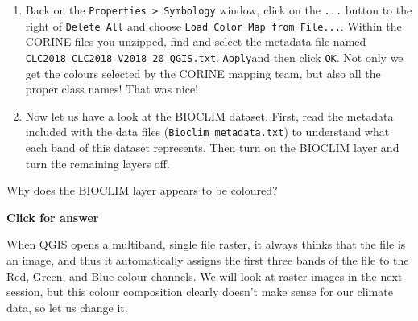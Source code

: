\documentclass[
  letterpaper,
  DIV=11,
  numbers=noendperiod]{scrreprt}
\begin{document}
\begin{enumerate}
\def\labelenumi{(\arabic{enumi})}
\setcounter{enumi}{141}
\item
  Back on the \texttt{Properties\ \textgreater{}\ Symbology} window,
  click on the \texttt{...} button to the right of \texttt{Delete\ All}
  and choose \texttt{Load\ Color\ Map\ from\ File...}. Within the CORINE
  files you unzipped, find and select the metadata file named
  \texttt{CLC2018\_CLC2018\_V2018\_20\_QGIS.txt}. \texttt{Apply}and then
  click \texttt{OK}. Not only we get the colours selected by the CORINE
  mapping team, but also all the proper class names! That was nice!
\item
  Now let us have a look at the BIOCLIM dataset. First, read the
  metadata included with the data files (\texttt{Bioclim\_metadata.txt})
  to understand what each band of this dataset represents. Then turn on
  the BIOCLIM layer and turn the remaining layers off.
\end{enumerate}

\begin{tcolorbox}[enhanced jigsaw, breakable, toptitle=1mm, colback=white, left=2mm, leftrule=.75mm, titlerule=0mm, colframe=quarto-callout-important-color-frame, opacityback=0, title=\textcolor{quarto-callout-important-color}{\faExclamation}\hspace{0.5em}{Stop and Think}, toprule=.15mm, opacitybacktitle=0.6, bottomtitle=1mm, colbacktitle=quarto-callout-important-color!10!white, bottomrule=.15mm, coltitle=black, rightrule=.15mm, arc=.35mm]

Why does the BIOCLIM layer appears to be coloured?

\end{tcolorbox}

\begin{tcolorbox}[enhanced jigsaw, leftrule=.75mm, colframe=quarto-callout-important-color-frame, breakable, toprule=.15mm, bottomrule=.15mm, arc=.35mm, rightrule=.15mm, opacityback=0, colback=white, left=2mm]

\vspace{-3mm}\textbf{Click for answer}\vspace{3mm}

When QGIS opens a multiband, single file raster, it always thinks that
the file is an image, and thus it automatically assigns the first three
bands of the file to the Red, Green, and Blue colour channels. We will
look at raster images in the next session, but this colour composition
clearly doesn't make sense for our climate data, so let us change it.

\end{tcolorbox}
\end{document}
